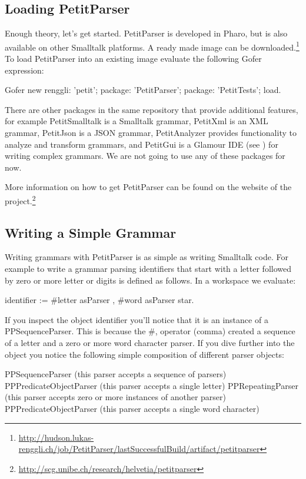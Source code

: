 \documentclass[a4paper,10pt,twoside]{book}
\begin{document}
\subsection{Loading PetitParser}

Enough theory, let's get started. PetitParser is developed in Pharo,
but is also available on other Smalltalk platforms. A ready made image
can be
downloaded.\footnote{\url{http://hudson.lukas-renggli.ch/job/PetitParser/lastSuccessfulBuild/artifact/petitparser}}
To load PetitParser into an existing image evaluate the following
Gofer expression:

\begin{code}{}
Gofer new
  renggli: 'petit';
  package: 'PetitParser';
  package: 'PetitTests';
  load.
\end{code}

There are other packages in the same repository that provide
additional features, for example PetitSmalltalk is a Smalltalk
grammar, PetitXml is an XML grammar, PetitJson is a JSON grammar,
PetitAnalyzer provides functionality to analyze and transform
grammars, and PetitGui is a Glamour IDE (see ) for
writing complex grammars. We are not going to use any of these
packages for now.

More information on how to get PetitParser can be found on the website
of the
project.\footnote{\url{http://scg.unibe.ch/research/helvetia/petitparser}}

\subsection{Writing a Simple Grammar}

Writing grammars with PetitParser is as simple as writing Smalltalk
code. For example to write a grammar  parsing identifiers that
start with a letter followed by zero or more letter or digits is
defined as follows. In a workspace we evaluate:

\begin{code}{}
identifier := #letter asParser , #word asParser star.  
\end{code}

If you inspect the object identifier you'll notice that it is an
instance of a PPSequenceParser. This is because the \#, operator
(comma) created a sequence of a letter and a zero or more word
character parser. If you dive further into the object you notice the
following simple composition of different parser objects:

\begin{code}{}
PPSequenceParser (this parser accepts a sequence of parsers)
    PPPredicateObjectParser (this parser accepts a single letter)
    PPRepeatingParser (this parser accepts zero or more instances of another parser)
       PPPredicateObjectParser (this parser accepts a single word character)  
\end{code}
\end{document}
